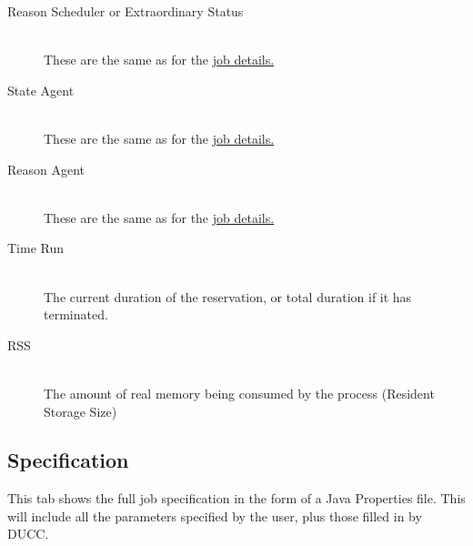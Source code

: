 \begin{description}
      \item[Reason Scheduler or Extraordinary Status] \hfill \\
        These are the same as for the \hyperref[itm:job-details-sched]{job details.}

      \item[State Agent] \hfill \\
        These are the same as for the \hyperref[itm:job-details-state]{job details.}

      \item[Reason Agent] \hfill \\
        These are the same as for the \hyperref[itm:job-details-agent]{job details.}

      \item[Time Run] \hfill \\
        The current duration of the reservation, or total duration if it has 
        terminated.
        
      \item[RSS] \hfill \\
        The amount of real memory being consumed by the process (Resident Storage Size)

   \end{description}

   \subsection{Specification}
   \label{sec:ws-service-specification}
   This tab shows the full job specification in the form of a Java Properties
   file.  This will include all the parameters specified by the user, plus those
   filled in by DUCC.
        
